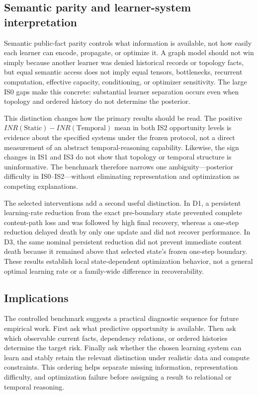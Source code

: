 \documentclass[11pt]{article}
\begin{document}
\subsection{Semantic parity and learner-system interpretation}

Semantic public-fact parity controls what information is available, not how easily each learner can encode, propagate, or optimize it. A graph model should not win simply because another learner was denied historical records or topology facts, but equal semantic access does not imply equal tensors, bottlenecks, recurrent computation, effective capacity, conditioning, or optimizer sensitivity. The large IS0 gaps make this concrete: substantial learner separation occurs even when topology and ordered history do not determine the posterior.

This distinction changes how the primary results should be read. The positive $INR(\mathrm{Static})-INR(\mathrm{Temporal})$ mean in both IS2 opportunity levels is evidence about the specified systems under the frozen protocol, not a direct measurement of an abstract temporal-reasoning capability. Likewise, the sign changes in IS1 and IS3 do not show that topology or temporal structure is uninformative. The benchmark therefore narrows one ambiguity---posterior difficulty in IS0--IS2---without eliminating representation and optimization as competing explanations.

The selected interventions add a second useful distinction. In D1, a persistent learning-rate reduction from the exact pre-boundary state prevented complete content-path loss and was followed by high final recovery, whereas a one-step reduction delayed death by only one update and did not recover performance. In D3, the same nominal persistent reduction did not prevent immediate content death because it remained above that selected state's frozen one-step boundary. These results establish local state-dependent optimization behavior, not a general optimal learning rate or a family-wide difference in recoverability.

\subsection{Implications}

The controlled benchmark suggests a practical diagnostic sequence for future empirical work. First ask what predictive opportunity is available. Then ask which observable current facts, dependency relations, or ordered histories determine the target risk. Finally ask whether the chosen learning system can learn and stably retain the relevant distinction under realistic data and compute constraints. This ordering helps separate missing information, representation difficulty, and optimization failure before assigning a result to relational or temporal reasoning.
\end{document}
